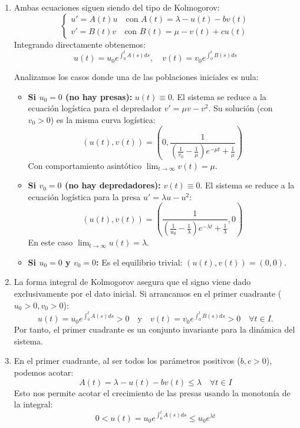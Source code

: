 {\begin{enumerate}[label=(\alph*)]
        \item Ambas ecuaciones siguen siendo del tipo de Kolmogorov:
        \[
            \begin{cases}
                u' = A(t)u \quad \text{con } A(t) = \lambda - u(t) - bv(t) \\
                v' = B(t)v \quad \text{con } B(t) = \mu - v(t) + cu(t)
            \end{cases}
        \]
        Integrando directamente obtenemos:
        \[
            u(t) = u_0 e^{\int_0^t A(s) ds}, \quad v(t) = v_0 e^{\int_0^t B(s) ds}
        \]
        
        Analizamos los casos donde una de las poblaciones iniciales es nula:
        \begin{itemize}
            \item \textbf{Si $u_0 = 0$ (no hay presas):}
            $u(t) \equiv 0$. El sistema se reduce a la ecuación logística para el depredador $v' = \mu v - v^2$. Su solución (con $v_0 > 0$) es la misma curva logística:
            \[
                (u(t), v(t)) = \left( 0, \frac{1}{\left( \frac{1}{v_0} - \frac{1}{\mu} \right) e^{-\mu t} + \frac{1}{\mu}} \right)
            \]
            Con comportamiento asintótico $\lim_{t \to \infty} v(t) = \mu$.

            \item \textbf{Si $v_0 = 0$ (no hay depredadores):}
            $v(t) \equiv 0$. El sistema se reduce a la ecuación logística para la presa $u' = \lambda u - u^2$:
            \[
                (u(t), v(t)) = \left( \frac{1}{\left( \frac{1}{u_0} - \frac{1}{\lambda} \right) e^{-\lambda t} + \frac{1}{\lambda}}, 0 \right)
            \]
            En este caso $\lim_{t \to \infty} u(t) = \lambda$.
            
            \item \textbf{Si $u_0 = 0$ y $v_0 = 0$:}
            Es el equilibrio trivial: $(u(t), v(t)) = (0, 0)$.
        \end{itemize}

        \item La forma integral de Kolmogorov asegura que el signo viene dado exclusivamente por el dato inicial. Si arrancamos en el primer cuadrante ($u_0 > 0, v_0 > 0$):
        \[
            u(t) = u_0 e^{\int_0^t A(s) ds} > 0 \quad \text{y} \quad v(t) = v_0 e^{\int_0^t B(s) ds} > 0 \quad \forall t \in I.
        \]
        Por tanto, el primer cuadrante es un conjunto invariante para la dinámica del sistema.

        \item En el primer cuadrante, al ser todos los parámetros positivos ($b, c > 0$), podemos acotar:
        \[
            A(t) = \lambda - u(t) - bv(t) \le \lambda \quad \forall t \in I
        \]
        Esto nos permite acotar el crecimiento de las presas usando la monotonía de la integral:
        \[
            0 < u(t) = u_0 e^{\int_0^t A(s) ds} \le u_0 e^{\lambda t}
        \]
        

\end{enumerate}}
